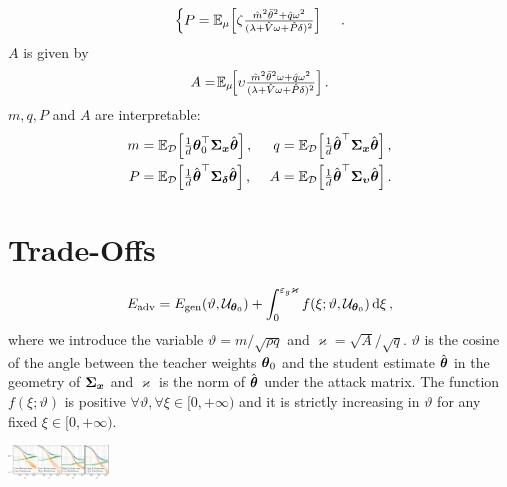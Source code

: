 \documentclass[a0paper,fleqn]{betterportraitposter}
\theoremstyle{plain}
\theoremstyle{definition}
\theoremstyle{remark}
\begin{document}
{\begin{multicols}{3}
\begin{equation}
\begin{cases}
        P = \mathbb{E}_{\mu} \qty[ 
            \zeta \frac{
                \hat{m}^2 \bar{\theta}^2 + \hat{q} \omega^2
            }{
                (\lambda + \hat{V} \omega + \hat{P} \delta)^2
            } 
        ] 
    \end{cases}\,.
\end{equation}
\(A\) is given by
\begin{equation}
    A = \! \mathbb{E}_{\mu} \! \qty[ 
    {\textstyle
        \upsilon \frac{\hat{m}^2 \bar{\theta}^2 \omega + \hat{q} \omega^2}{(\lambda + \hat{V} \omega + \hat{P} \delta)^2} 
    }
    ] \,.
\end{equation}
\(m,q,P\) and \(A\) are interpretable:
\begin{equation}\label{eq:interpretation-overlaps}
\begin{aligned}
    m &= {\textstyle \mathbb{E}_{\mathcal{D}}\qty[\frac{1}{d} \wstar^\top \Sigmax \what] }\,, & \  
    q &= {\textstyle \mathbb{E}_{\mathcal{D}}\qty[\frac{1}{d} \what^\top \Sigmax \what] }\,, \\
    P &= {\textstyle \mathbb{E}_{\mathcal{D}}\qty[\frac{1}{d} \what^\top \Sigmadelta \what] } \,, &\ 
    A &= {\textstyle \mathbb{E}_{\mathcal{D}}\qty[\frac{1}{d} \what^\top \Sigmaupsilon \what] } \,.
\end{aligned}
\end{equation}

\section{Trade-Offs}

\begin{equation}
    E_{\mathrm{adv}} = 
    {
        E_{\mathrm{gen}}(\vartheta, \mathcal{U}_{\boldsymbol{\theta}_0}) + 
        \int_{0}^{\varepsilon_g \varkappa } 
        f(\xi; \vartheta, \mathcal{U}_{\boldsymbol{\theta}_0}) \dd{\xi}
    } \,,
\end{equation}
where we introduce the variable \(\vartheta = m / \sqrt{\rho q}\) and \(\varkappa = \sqrt{A} / \sqrt{q}\). 
\(\vartheta\) is the cosine of the angle between the teacher weights \(\boldsymbol{\theta}_0\) and the student estimate \(\hat{\boldsymbol{\theta}}\) in the geometry of \(\boldsymbol{\Sigma}_{\boldsymbol{\boldsymbol{x}}}\) and \(\varkappa\) is the norm of \(\hat{\boldsymbol{\theta}}\) under the attack matrix.
The function \(f(\xi;\vartheta)\) is positive \(\forall \vartheta, \forall \xi \in [0, +\infty)\) and it is strictly increasing in \(\vartheta\) for any fixed \(\xi \in [0,+\infty)\). 

\includegraphics[width=0.2\textwidth]{Assets/feature_combinations_alpha_sweep.pdf}



\end{multicols}}
\end{document}
